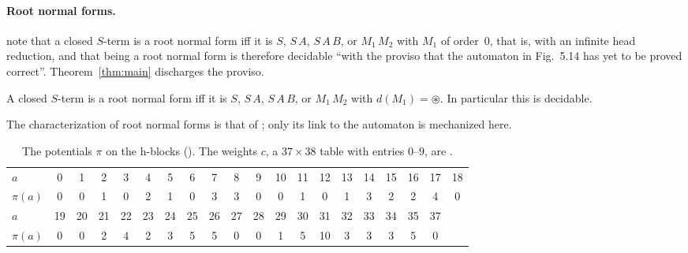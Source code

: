 \paragraph{Root normal forms.} \citet[footnote~4]{dots} note that a closed $S$-term is a
root normal form iff it is $S$, $S\,A$, $S\,A\,B$, or $M_1\,M_2$ with $M_1$ of order~$0$,
that is, with an infinite head reduction, and that being a root normal form is therefore
decidable ``with the proviso that the automaton in Fig.~5.14 has yet to be proved
correct''. Theorem~\ref{thm:main} discharges the proviso.

\begin{corollary}\label{cor:rnf}
A closed $S$-term is a root normal form iff it is $S$, $S\,A$, $S\,A\,B$, or $M_1\,M_2$
with $d(M_1)=\circledast$. In particular this is decidable.
\end{corollary}

The characterization of root normal forms is that of \citet{dots}; only its link to
the automaton is mechanized here.

\begin{table}[t]
\centering\small\setlength{\tabcolsep}{3.2pt}
\begin{tabular}{l*{19}{c}}
\toprule
$a$ & 0 & 1 & 2 & 3 & 4 & 5 & 6 & 7 & 8 & 9 & 10 & 11 & 12 & 13 & 14 & 15 & 16 & 17 & 18 \\
$\pi(a)$ & 0 & 0 & 1 & 0 & 2 & 1 & 0 & 3 & 3 & 0 & 0 & 1 & 0 & 1 & 3 & 2 & 2 & 4 & 0 \\
\midrule
$a$ & 19 & 20 & 21 & 22 & 23 & 24 & 25 & 26 & 27 & 28 & 29 & 30 & 31 & 32 & 33 & 34 & 35 & 37 \\
$\pi(a)$ & 0 & 0 & 2 & 4 & 2 & 3 & 5 & 5 & 0 & 0 & 1 & 5 & 10 & 3 & 3 & 3 & 5 & 0 \\
\bottomrule
\end{tabular}
\caption{The potentials $\pi$ on the h-blocks (). The weights $c$,
a $37\times38$ table with entries $0$--$9$, are .}\label{tab:cert}
\end{table}

